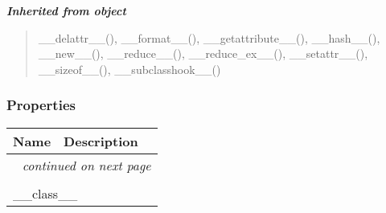 \large{\textbf{\textit{Inherited from object}}}

\begin{quote}
\_\_delattr\_\_(), \_\_format\_\_(), \_\_getattribute\_\_(), \_\_hash\_\_(), \_\_new\_\_(), \_\_reduce\_\_(), \_\_reduce\_ex\_\_(), \_\_setattr\_\_(), \_\_sizeof\_\_(), \_\_subclasshook\_\_()
\end{quote}


  \subsubsection{Properties}

    \vspace{-1cm}
\hspace{\varindent}\begin{longtable}{|p{\varnamewidth}|p{\vardescrwidth}|l}
\cline{1-2}
\cline{1-2} \centering \textbf{Name} & \centering \textbf{Description}& \\
\cline{1-2}
\endhead\cline{1-2}\multicolumn{3}{r}{\small\textit{continued on next page}}\\\endfoot\cline{1-2}
\endlastfoot\multicolumn{2}{|l|}{\textit{Inherited from object}}\\
\multicolumn{2}{|p{\varwidth}|}{\raggedright \_\_class\_\_}\\
\cline{1-2}
\end{longtable}

